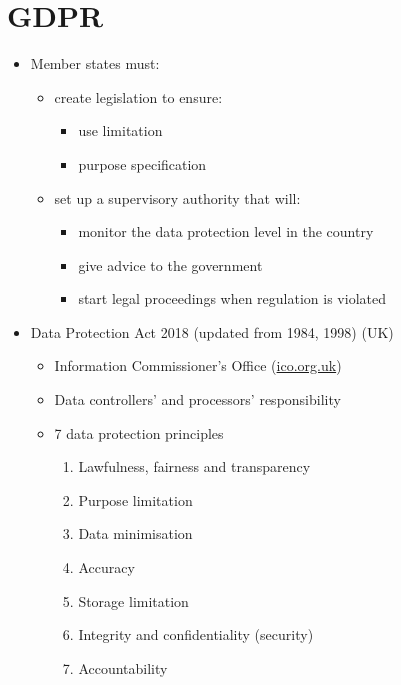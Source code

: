 \documentclass{article}
\begin{document}
\section{GDPR}
\begin{itemize}
\item Member states must:
\begin{itemize}
\item create legislation to ensure:
\begin{itemize}
\item use limitation
\item purpose specification 
\end{itemize}

\item set up a supervisory authority that will:
\begin{itemize}
\item monitor the data protection level in the country
\item give advice to the government 
\item start legal proceedings when regulation is violated
\end{itemize}
\end{itemize}

\item Data Protection Act 2018 (updated from 1984, 1998) (UK)
\begin{itemize}
\item Information Commissioner's Office (\href{https://ico.org.uk/}{ico.org.uk}) 
\item Data controllers' and processors' responsibility
\item 7 data protection principles
\begin{enumerate}[label=\alph*]
\item Lawfulness, fairness and transparency
\item Purpose limitation
\item Data minimisation
\item Accuracy
\item Storage limitation
\item Integrity and confidentiality (security)
\item Accountability
\end{enumerate}
\end{itemize}
\end{itemize}
\end{document}
